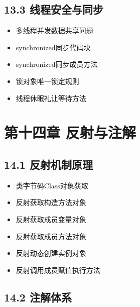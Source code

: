 \subsection{13.3 线程安全与同步}
\begin{itemize}
\item 多线程并发数据共享问题
\item synchronized同步代码块
\item synchronized同步成员方法
\item 锁对象唯一锁定规则
\item 线程休眠礼让等待方法
\end{itemize}

\section{第十四章 反射与注解}
\subsection{14.1 反射机制原理}
\begin{itemize}
\item 类字节码Class对象获取
\item 反射获取构造方法对象
\item 反射获取成员变量对象
\item 反射获取成员方法对象
\item 反射动态创建实例对象
\item 反射调用成员赋值执行方法
\end{itemize}

\subsection{14.2 注解体系}
\begin{itemize}
\item 注解标记作用与分类
\item 系统内置基础注解用途
\item 元注解修饰注解范围
\item 自定义注解格式编写
\item 代码中解析注解数据}
\end{itemize}
